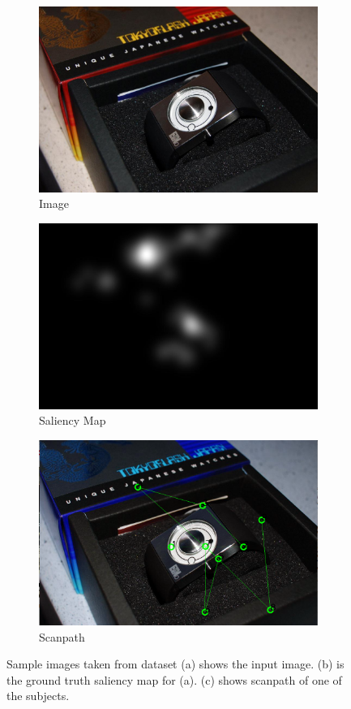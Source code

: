 \documentclass{article} %
\begin{document}
\begin{figure}
\begin{subfigure}{.33\textwidth}
  \centering
  \includegraphics[width=.8\linewidth]{input.jpeg}
  \caption{Image}
  \label{fig:sfig1}
\end{subfigure}%
\begin{subfigure}{.33\textwidth}
  \centering
  \includegraphics[width=.8\linewidth]{map.jpg}
  \caption{Saliency Map}
  \label{fig:sfig2}
\end{subfigure}
\begin{subfigure}{.33\textwidth}
  \centering
  \includegraphics[width=.8\linewidth]{scanpath.png}
  \caption{Scanpath}
  \label{fig:sfig3}
\end{subfigure}
\caption{Sample images taken from \cite{Judd_2009} dataset (a) shows the input image. (b) is the ground truth saliency map for (a). (c) shows scanpath of one of the subjects. }
\label{fig:fig}
\end{figure}
\end{document}
